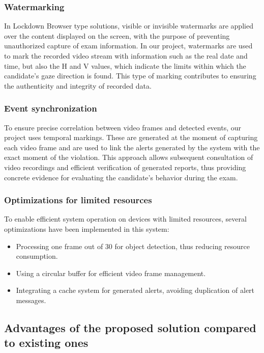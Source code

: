 \documentclass[12pt,a4paper]{article}
\begin{document}
\subsubsection{Watermarking}
In Lockdown Browser type solutions, visible or invisible watermarks are applied over the content displayed on the screen, with the purpose of preventing unauthorized capture of exam information. In our project, watermarks are used to mark the recorded video stream with information such as the real date and time, but also the H and V values, which indicate the limits within which the candidate's gaze direction is found. This type of marking contributes to ensuring the authenticity and integrity of recorded data.

\subsubsection{Event synchronization}
To ensure precise correlation between video frames and detected events, our project uses temporal markings. These are generated at the moment of capturing each video frame and are used to link the alerts generated by the system with the exact moment of the violation. This approach allows subsequent consultation of video recordings and efficient verification of generated reports, thus providing concrete evidence for evaluating the candidate's behavior during the exam.

\subsubsection{Optimizations for limited resources}
To enable efficient system operation on devices with limited resources, several optimizations have been implemented in this system:
\begin{itemize}
    \item Processing one frame out of 30 for object detection, thus reducing resource consumption.
    \item Using a circular buffer for efficient video frame management.
    \item Integrating a cache system for generated alerts, avoiding duplication of alert messages.
\end{itemize}

\subsection{Advantages of the proposed solution compared to existing ones}
\end{document}

